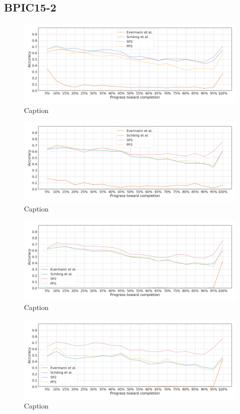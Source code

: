 \FloatBarrier
\subsection{BPIC15-2}
\begin{figure}[!htb]
    \centering
    \includegraphics[width=\textwidth]{gfx/bpic2015_2/individual_stability.png}
    \caption{Caption}
    \label{fig:my_label}
\end{figure}
\begin{figure}[!htb]
    \centering
    \includegraphics[width=\textwidth]{gfx/bpic2015_2/grouped_stability.png}
    \caption{Caption}
    \label{fig:my_label}
\end{figure}
\begin{figure}[!htb]
    \centering
    \includegraphics[width=\textwidth]{gfx/bpic2015_2/padded_stability.png}
    \caption{Caption}
    \label{fig:my_label}
\end{figure}
\begin{figure}[!htb]
    \centering
    \includegraphics[width=\textwidth]{gfx/bpic2015_2/windowed_stability.png}
    \caption{Caption}
    \label{fig:my_label}
\end{figure}

